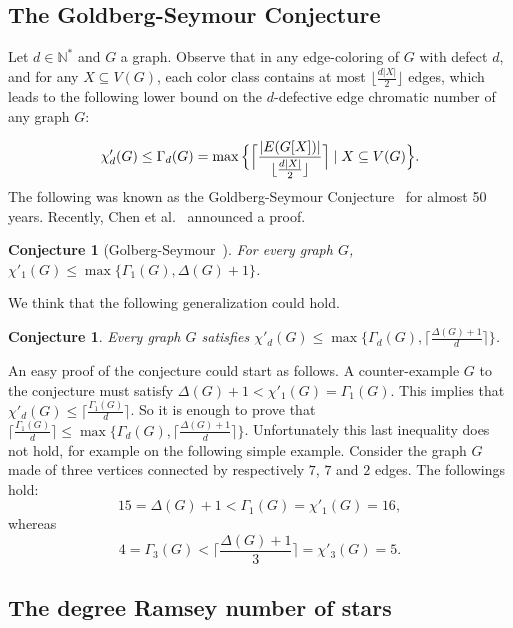 \documentclass[11pt]{article}
\newtheorem{conjecture}[lemma]{Conjecture}
\begin{document}
\subsection*{The Goldberg-Seymour Conjecture}
Let $d \in \mathbb N^*$ and $G$ a graph. Observe that in any edge-coloring of $G$ with defect $d$, and for any $X \subseteq V(G)$, each color class contains at most $\lfloor \frac{d|X|}{2} \rfloor$ edges, which leads to the following lower bound on the $d$-defective edge chromatic number of any graph $G$: 

$$
    \chi'_d(G) \leq \Gamma_d(G) = 
    \max 
    \Big\{ \Bigl\lceil \frac{|E(G[X])|}{\lfloor \frac{d|X|}{2}\rfloor} \Bigr\rceil \mid X \subseteq V(G) \Big\}.
$$
The following was known as the Goldberg-Seymour Conjecture~\cite{G73, S79} for almost 50 years. Recently, Chen et al.~\cite{CJZ19} announced a proof. 

\begin{conjecture}[Golberg-Seymour~\cite{G73, S79}]\label{conj:goldberg}  
For every graph $G$,\\ $\chi'_1(G) \leq \max\{\Gamma_1(G), \Delta(G) + 1\}$. 
\end{conjecture}

We think that the following generalization could hold. 

\begin{conjecture}\label{conj:Golderg_gen}
Every graph $G$ satisfies $\chi'_d(G) \leq \max\{\Gamma_d(G), \lceil \frac{\Delta(G) +1}{d} \rceil\}$.
\end{conjecture}

An easy proof of the conjecture could start as follows.  A counter-example $G$ to the conjecture must satisfy $\Delta(G) +1 < \chi'_1(G) =\Gamma_1(G)$. 
This implies that $\chi'_d(G) \leq \lceil \frac{\Gamma_1(G)}{d} \rceil$. 
So it is enough to prove that $\lceil \frac{\Gamma_1(G)}{d} \rceil \leq \max\{\Gamma_d(G), \lceil \frac{\Delta(G) +1}{d} \rceil\}$. Unfortunately this last inequality does not hold, for example on the following simple example.  
Consider the graph $G$ made of three vertices connected by respectively $7$, $7$ and $2$ edges. The followings hold: 
$$15 = \Delta(G) +1 < \Gamma_1(G)= \chi'_1(G) = 16,$$ whereas 
$$4 =  \Gamma_3(G) < \lceil \frac{\Delta(G) + 1}{3}\rceil =  \chi'_3(G) = 5.$$

\subsection*{The degree Ramsey number of stars}
\end{document}
